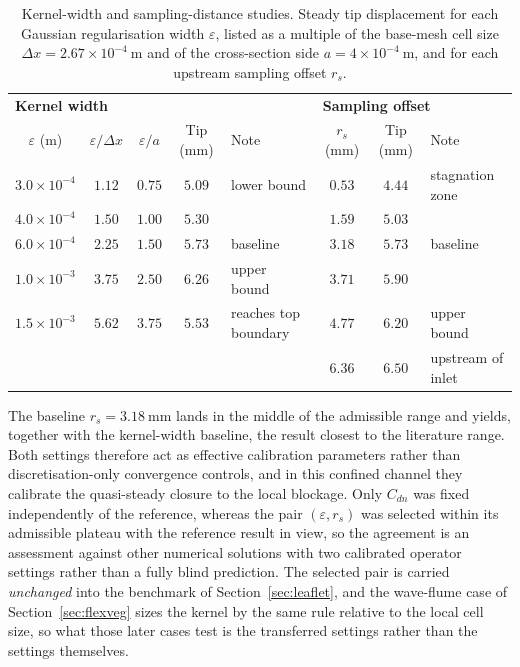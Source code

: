 \begin{table}[!ht]
\centering
\small
\caption{Kernel-width and sampling-distance studies. Steady tip displacement for each Gaussian regularisation width $\varepsilon$, listed as a multiple of the base-mesh cell size $\Delta x = 2.67\times10^{-4}~\mathrm{m}$ and of the cross-section side $a = 4\times10^{-4}~\mathrm{m}$, and for each upstream sampling offset $r_s$.}
\label{tab:beamtunnel_operator_cases}
\setlength{\tabcolsep}{4pt}
\renewcommand{\arraystretch}{1.15}
\begin{tabular}{c c c c l @{\qquad} c c l}
\toprule
\multicolumn{5}{l}{\textbf{Kernel width}} & \multicolumn{3}{l}{\textbf{Sampling offset}} \\
$\varepsilon$ (m) & $\varepsilon/\Delta x$ & $\varepsilon/a$ & Tip (mm) & Note & $r_s$ (mm) & Tip (mm) & Note \\
\midrule
$3.0\times10^{-4}$ & $1.12$ & $0.75$ & $5.09$ & lower bound        & $0.53$ & $4.44$ & stagnation zone \\
$4.0\times10^{-4}$ & $1.50$ & $1.00$ & $5.30$ &                    & $1.59$ & $5.03$ & \\
$6.0\times10^{-4}$ & $2.25$ & $1.50$ & $5.73$ & baseline           & $3.18$ & $5.73$ & baseline \\
$1.0\times10^{-3}$ & $3.75$ & $2.50$ & $6.26$ & upper bound        & $3.71$ & $5.90$ & \\
$1.5\times10^{-3}$ & $5.62$ & $3.75$ & $5.53$ & reaches top boundary & $4.77$ & $6.20$ & upper bound \\
                   &        &        &        &                    & $6.36$ & $6.50$ & upstream of inlet \\
\bottomrule
\end{tabular}
\end{table}

\noindent
The baseline $r_s = 3.18~\mathrm{mm}$ lands in the middle of the admissible range and yields, together with the kernel-width baseline, the result closest to the literature range. Both settings therefore act as effective calibration parameters rather than discretisation-only convergence controls, and in this confined channel they calibrate the quasi-steady closure to the local blockage. Only $C_{dn}$ was fixed independently of the reference, whereas the pair $(\varepsilon, r_s)$ was selected within its admissible plateau with the reference result in view, so the agreement is an assessment against other numerical solutions with two calibrated operator settings rather than a fully blind prediction. The selected pair is carried \emph{unchanged} into the benchmark of Section~\ref{sec:leaflet}, and the wave-flume case of Section~\ref{sec:flexveg} sizes the kernel by the same rule relative to the local cell size, so what those later cases test is the transferred settings rather than the settings themselves.

